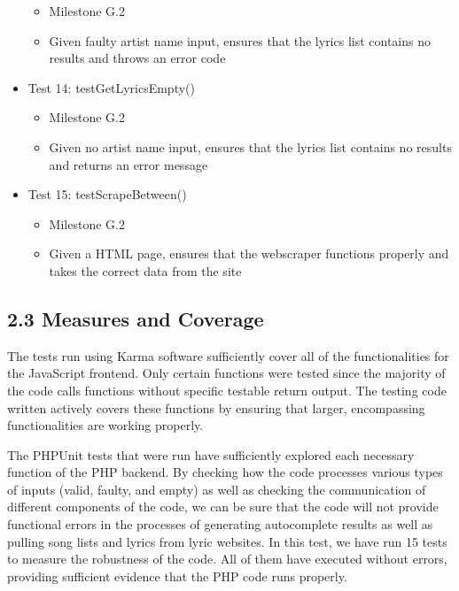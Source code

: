 \documentclass[]{article}
\begin{document}
\begin{itemize}
  \begin{itemize}
  \itemsep1pt\parskip0pt
  \item
    Milestone G.2
  \item
    Given faulty artist name input, ensures that the lyrics list
    contains no results and throws an error code
  \end{itemize}
\item
  Test 14: testGetLyricsEmpty()

  \begin{itemize}
  \itemsep1pt\parskip0pt
  \item
    Milestone G.2
  \item
    Given no artist name input, ensures that the lyrics list contains no
    results and returns an error message
  \end{itemize}
\item
  Test 15: testScrapeBetween()

  \begin{itemize}
  \itemsep1pt\parskip0pt
  \item
    Milestone G.2
  \item
    Given a HTML page, ensures that the webscraper functions properly
    and takes the correct data from the site
  \end{itemize}
\end{itemize}

\subsection{\textbf{2.3 Measures and
Coverage}}\label{measures-and-coverage}

The tests run using Karma software sufficiently cover all of the
functionalities for the JavaScript frontend. Only certain functions were
tested since the majority of the code calls functions without specific
testable return output. The testing code written actively covers these
functions by ensuring that larger, encompassing functionalities are
working properly.

The PHPUnit tests that were run have sufficiently explored each
necessary function of the PHP backend. By checking how the code
processes various types of inputs (valid, faulty, and empty) as well as
checking the communication of different components of the code, we can
be sure that the code will not provide functional errors in the
processes of generating autocomplete results as well as pulling song
lists and lyrics from lyric websites. In this test, we have run 15 tests
to measure the robustness of the code. All of them have executed without
errors, providing sufficient evidence that the PHP code runs properly.
\end{document}
